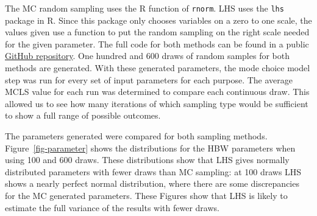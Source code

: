 \documentclass[
  futuretransp,
  submit,
  moreauthors,
]{Definitions/mdpi}
\begin{document}
The MC random sampling uses the R function of \texttt{rnorm}. LHS uses
the \texttt{lhs} package in R. Since this package only chooses variables
on a zero to one scale, the values given use a function to put the
random sampling on the right scale needed for the given parameter. The
full code for both methods can be found in a public
\href{https://github.com/natmaegray/sensitivity_thesis}{GitHub
repository}. One hundred and 600 draws of random samples for both
methods are generated. With these generated parameters, the mode choice
model step was run for every set of input parameters for each purpose.
The average MCLS value for each run was determined to compare each
continuous draw. This allowed us to see how many iterations of which
sampling type would be sufficient to show a full range of possible
outcomes.

The parameters generated were compared for both sampling methods.
Figure~\ref{fig-parameter} shows the distributions for the HBW
parameters when using 100 and 600 draws. These distributions show that
LHS gives normally distributed parameters with fewer draws than MC
sampling: at 100 draws LHS shows a nearly perfect normal distribution,
where there are some discrepancies for the MC generated parameters.
These Figures show that LHS is likely to estimate the full variance of
the results with fewer draws.
\end{document}
